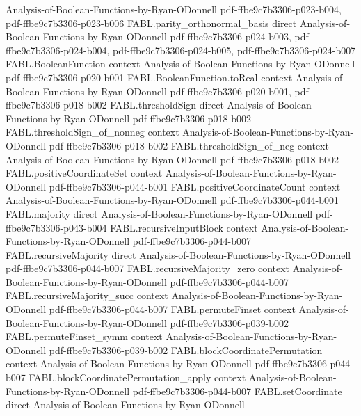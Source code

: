 \begin{theorem}
  {Analysis-of-Boolean-Functions-by-Ryan-ODonnell}
  {pdf-ffbe9c7b3306-p023-b004,
    pdf-ffbe9c7b3306-p023-b006}
\proofstep
  {FABL.parity_orthonormal_basis}
  {direct}
  {Analysis-of-Boolean-Functions-by-Ryan-ODonnell}
  {pdf-ffbe9c7b3306-p024-b003,
    pdf-ffbe9c7b3306-p024-b004,
    pdf-ffbe9c7b3306-p024-b005,
    pdf-ffbe9c7b3306-p024-b007}
\proofstep
  {FABL.BooleanFunction}
  {context}
  {Analysis-of-Boolean-Functions-by-Ryan-ODonnell}
  {pdf-ffbe9c7b3306-p020-b001}
\proofstep
  {FABL.BooleanFunction.toReal}
  {context}
  {Analysis-of-Boolean-Functions-by-Ryan-ODonnell}
  {pdf-ffbe9c7b3306-p020-b001,
    pdf-ffbe9c7b3306-p018-b002}
\proofstep
  {FABL.thresholdSign}
  {direct}
  {Analysis-of-Boolean-Functions-by-Ryan-ODonnell}
  {pdf-ffbe9c7b3306-p018-b002}
\proofstep
  {FABL.thresholdSign_of_nonneg}
  {context}
  {Analysis-of-Boolean-Functions-by-Ryan-ODonnell}
  {pdf-ffbe9c7b3306-p018-b002}
\proofstep
  {FABL.thresholdSign_of_neg}
  {context}
  {Analysis-of-Boolean-Functions-by-Ryan-ODonnell}
  {pdf-ffbe9c7b3306-p018-b002}
\proofstep
  {FABL.positiveCoordinateSet}
  {context}
  {Analysis-of-Boolean-Functions-by-Ryan-ODonnell}
  {pdf-ffbe9c7b3306-p044-b001}
\proofstep
  {FABL.positiveCoordinateCount}
  {context}
  {Analysis-of-Boolean-Functions-by-Ryan-ODonnell}
  {pdf-ffbe9c7b3306-p044-b001}
\proofstep
  {FABL.majority}
  {direct}
  {Analysis-of-Boolean-Functions-by-Ryan-ODonnell}
  {pdf-ffbe9c7b3306-p043-b004}
\proofstep
  {FABL.recursiveInputBlock}
  {context}
  {Analysis-of-Boolean-Functions-by-Ryan-ODonnell}
  {pdf-ffbe9c7b3306-p044-b007}
\proofstep
  {FABL.recursiveMajority}
  {direct}
  {Analysis-of-Boolean-Functions-by-Ryan-ODonnell}
  {pdf-ffbe9c7b3306-p044-b007}
\proofstep
  {FABL.recursiveMajority_zero}
  {context}
  {Analysis-of-Boolean-Functions-by-Ryan-ODonnell}
  {pdf-ffbe9c7b3306-p044-b007}
\proofstep
  {FABL.recursiveMajority_succ}
  {context}
  {Analysis-of-Boolean-Functions-by-Ryan-ODonnell}
  {pdf-ffbe9c7b3306-p044-b007}
\proofstep
  {FABL.permuteFinset}
  {context}
  {Analysis-of-Boolean-Functions-by-Ryan-ODonnell}
  {pdf-ffbe9c7b3306-p039-b002}
\proofstep
  {FABL.permuteFinset_symm}
  {context}
  {Analysis-of-Boolean-Functions-by-Ryan-ODonnell}
  {pdf-ffbe9c7b3306-p039-b002}
\proofstep
  {FABL.blockCoordinatePermutation}
  {context}
  {Analysis-of-Boolean-Functions-by-Ryan-ODonnell}
  {pdf-ffbe9c7b3306-p044-b007}
\proofstep
  {FABL.blockCoordinatePermutation_apply}
  {context}
  {Analysis-of-Boolean-Functions-by-Ryan-ODonnell}
  {pdf-ffbe9c7b3306-p044-b007}
\proofstep
  {FABL.setCoordinate}
  {direct}
  {Analysis-of-Boolean-Functions-by-Ryan-ODonnell}

\end{theorem}
